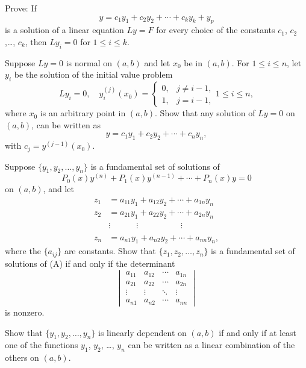 \begin{exerciselist}
\item\label{exer:9.1.13}Prove:  If
\[
y=c_1y_1+c_2y_2+\cdots+c_ky_k+y_p
\]
is a solution of a linear equation $Ly=F$ for every choice of the
constants $c_1$, $c_2$ ,\dots, $c_k$, then $Ly_i=0$ for $1\le i\le k$.

\item\label{exer:9.1.14}Suppose $Ly=0$ is normal on $(a,b)$ and let $x_0$ be in $(a,b)$.
For $1\le i\le n$, let $y_i$ be the solution of the initial value
problem
\[
Ly_i=0, \quad  y_i^{(j)} (x_0)=
\begin{cases}
0,& j\ne i-1,\\
1,&j=i-1,
\end{cases}
1\le i\le n,
\]
where $x_0$ is an arbitrary point in $(a,b)$.  Show that any solution
of $Ly=0$ on $(a, b)$, can be written as
\[
y=c_1y_1+c_2y_2+\cdots+c_ny_n,
\]
with $c_j=y^{(j-1)}(x_0)$.

\item\label{exer:9.1.15}Suppose $\{y_1, y_2,\dots, y_n\}$ is a fundamental set of
solutions of
\[
P_0(x)y^{(n)}+P_1(x)y^{(n-1)}+\cdots+P_n(x)y=0
\]
on $(a,b)$, and let
\begin{align*}
z_1&=a_{11}y_1+a_{12}y_2+\cdots+a_{1n}y_n\\
z_2&=a_{21}y_1+a_{22}y_2+\cdots+a_{2n}y_n\\
&\vdots\phantom{_1y_1+a}\vdots\phantom{_2y_2+\cdots+a}\vdots\\
z_n&=a_{n1}y_1+a_{n2}y_2+\cdots+a_{nn}y_n,
\end{align*}
where the $\{a_{ij}\}$ are constants. Show that $\{z_1, z_2,\dots,
z_n\}$ is a fundamental set of solutions  of (A) if and only if the
determinant
\[
\begin{vmatrix}
a_{11}&a_{12}&\cdots&a_{1n}\\
a_{21}&a_{22}&\cdots&a_{2n}\\
\vdots&\vdots&\ddots&\vdots\\
a_{n1}&a_{n2}&\cdots&a_{nn}
\end{vmatrix}
\]
is nonzero. 

\item\label{exer:9.1.16}Show that $\{y_1,y_2,\dots,y_n\}$ is linearly dependent on $(a,b)$ if
and only if at least one of the functions $y_1$, $y_2$, \dots, $y_n$ can be
written as a linear combination of the others on $(a,b)$.



\end{exerciselist}
